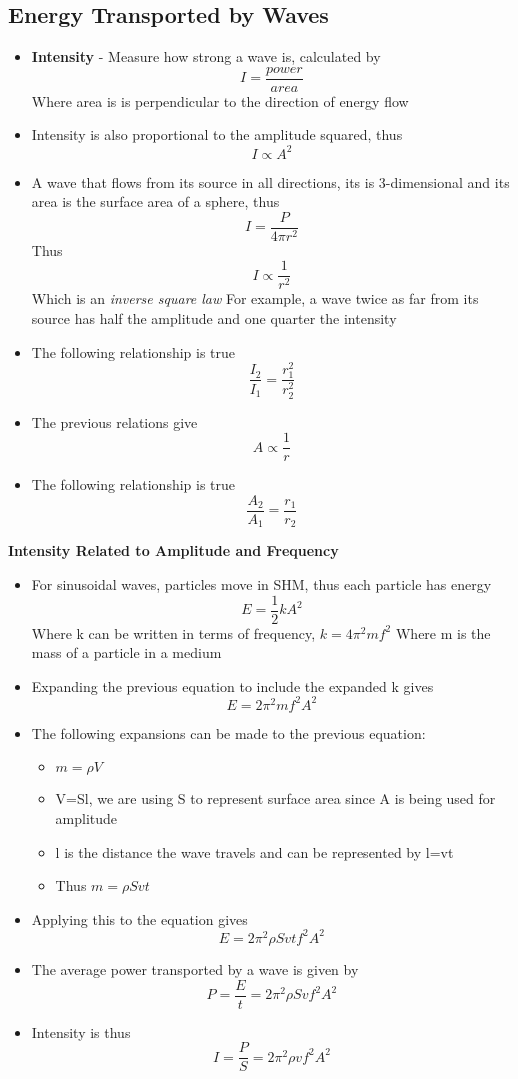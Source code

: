 \subsection{Energy Transported by Waves}
\begin{itemize}
    \item \textbf{Intensity} - Measure how strong a wave is, calculated by \[I=\frac{power}{area}\] Where area is is perpendicular to the direction of energy flow
    \item Intensity is also proportional to the amplitude squared, thus \[I\propto A^2\]
    \item A wave that flows from its source in all directions, its is 3-dimensional and its area is the surface area of a sphere, thus \[I=\frac{P}{4\pi r^2}\] Thus \[I\propto \frac{1}{r^2}\] Which is an \emph{inverse square law} For example, a wave twice as far from its source has half the amplitude and one quarter the intensity
    \item The following relationship is true \[\frac{I_2}{I_1}=\frac{r_1^2}{r_2^2}\]
    \item The previous relations give \[A\propto \frac{1}{r}\]
    \item The following relationship is true \[\frac{A_2}{A_1}=\frac{r_1}{r_2}\]
\end{itemize}

\textbf{Intensity Related to Amplitude and Frequency}
\begin{itemize}
    \item For sinusoidal waves, particles move in SHM, thus each particle has energy \[E=\frac{1}{2}kA^2\] Where k can be written in terms of frequency, \(k=4\pi^2 mf^2\)
    Where m is the mass of a particle in a medium
    \item Expanding the previous equation to include the expanded k gives \[E=2\pi^2 mf^2A^2\]
    \item The following expansions can be made to the previous equation:
    \begin{itemize}
        \item \(m=\rho V\)
        \item V=Sl, we are using S to represent surface area since A is being used for amplitude
        \item l is the distance the wave travels and can be represented by l=vt
        \item Thus \(m=\rho Svt\)
    \end{itemize}
    \item Applying this to the equation gives \[E=2\pi^2 \rho Svtf^2A^2\]
    \item The average power transported by a wave is given by \[P=\frac{E}{t}=2\pi^2 \rho Svf^2A^2\]
    \item Intensity is thus \[I=\frac{P}{S}=2\pi^2 \rho vf^2A^2\] 
\end{itemize}


